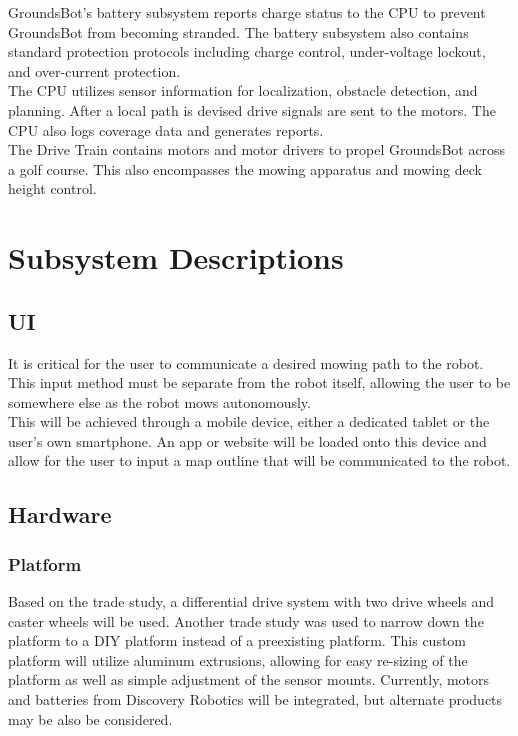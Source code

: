 \documentclass[12pt]{extarticle}
\begin{document}
  GroundsBot's battery subsystem reports charge status to the CPU to prevent GroundsBot from becoming stranded. The battery subsystem also contains standard protection protocols including charge control, under-voltage lockout, and over-current protection. \\

  The CPU utilizes sensor information for localization, obstacle detection, and planning.  After a local path is devised drive signals are sent to the motors. The CPU also logs coverage data and generates reports.\\

  The Drive Train contains motors and motor drivers to propel GroundsBot across a golf course.  This also encompasses the mowing apparatus and mowing deck height control. \\

\newpage
\section{Subsystem Descriptions}
  \subsection{UI}
  It is critical for the user to communicate a desired mowing path to the robot. This input method must be separate from the robot itself, allowing the user to be somewhere else as the robot mows autonomously. \\
  
  This will be achieved through a mobile device, either a dedicated tablet or the user's own smartphone. An app or website will be loaded onto this device and allow for the user to input a map outline that will be communicated to the robot. 
  
  \subsection{Hardware}
    \subsubsection{Platform}
      Based on the trade study, a differential drive system with two drive wheels and caster wheels will be used. Another trade study was used to narrow down the platform to a DIY platform instead of a preexisting platform. This custom platform will utilize aluminum extrusions, allowing for easy re-sizing of the platform as well as simple adjustment of the sensor mounts. Currently, motors and batteries from Discovery Robotics will be integrated, but alternate products may be also be considered. 
      
\end{document}

